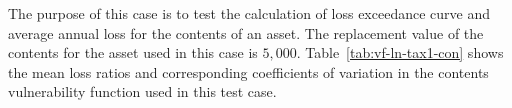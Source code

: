 The purpose of this case is to test the calculation of loss exceedance curve and average annual loss for the contents of an asset. The replacement value of the contents for the asset used in this case is $5,000$. Table~\ref{tab:vf-ln-tax1-con} shows the mean loss ratios and corresponding coefficients of variation in the contents vulnerability function used in this test case.